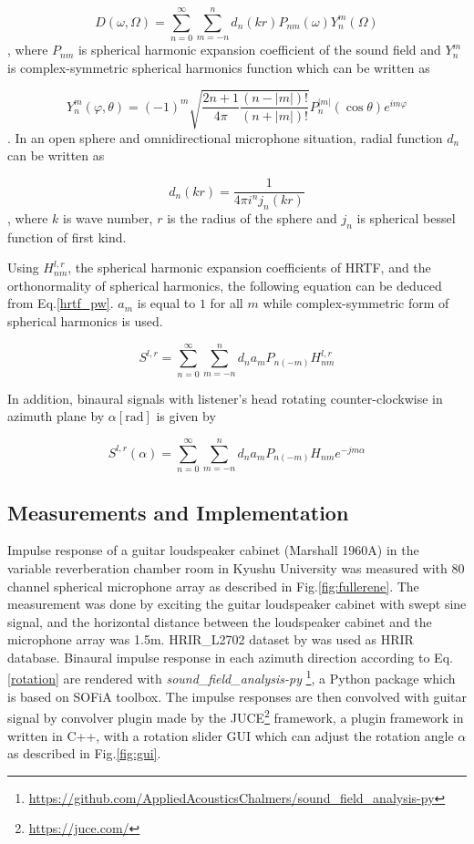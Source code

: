 \documentclass[convention,e-brief]{aesconf-current}
\begin{document}
\begin{equation}
    D\left(\omega, \Omega\right)=\sum_{n=0}^{\infty} \sum_{m=-n}^{n} d_{n}(k r) P_{n m}(\omega) Y_{n}^{m}\left(\Omega\right)
\end{equation}
, where $P_{nm}$ is spherical harmonic expansion coefficient of the sound field and $Y^{m}_n$ is complex-symmetric spherical harmonics function which can be written as

$$
    Y_{n}^{m}(\varphi, \theta) =(-1)^{m} \sqrt{\frac{2 n+1}{4 \pi} \frac{(n-|m|) !}{(n+|m|) !}} P_{n}^{|m|}(\cos \theta) e^{i m \varphi}
$$
.
In an open sphere and omnidirectional microphone situation, radial function $d_n$ can be written as

$$
    d_{n}(kr)=\frac{1}{4 \pi i^{n} j_{n}\left(k r\right)}
$$
, where $k$ is wave number, $r$ is the radius of the sphere and $j_n$ is spherical bessel function of first kind.

Using $H_{nm}^{l,r}$, the spherical harmonic expansion coefficients of HRTF, and the orthonormality of spherical harmonics, the following equation can be deduced from Eq.\ref{hrtf_pw}. $a_{m}$ is equal to $1$ for all $m$ while complex-symmetric form of spherical harmonics is used.

\begin{equation}
    \label{binaural_signal}
    S^{l, r} =\sum_{n=0}^{\infty} \sum_{m=-n}^{n} d_{n} a_{m} P_{n(-m)} H_{n m}^{l,r}
\end{equation}

In addition, binaural signals with listener's head rotating counter-clockwise in azimuth plane by $\alpha[\mathrm{rad}]$ is given by

\begin{equation}
    \label{rotation}
    S^{l, r}(\alpha)=\sum_{n=0}^{\infty} \sum_{m=-n}^{n} d_{n} a_{m} P_{n(-m)} H_{n m} e^{-j m \alpha}
\end{equation}

\subsection{Measurements and Implementation}

Impulse response of a guitar loudspeaker cabinet (Marshall 1960A) in the variable reverberation chamber  room in Kyushu University was measured with 80 channel spherical microphone array as described in Fig.\ref{fig:fullerene}.
The measurement was done by exciting the guitar loudspeaker cabinet with swept sine signal, and the horizontal distance between the loudspeaker cabinet and the microphone array was 1.5m.
HRIR\_L2702 dataset by \citet{Bernschutz2013-zy} was used as HRIR database.
Binaural impulse response in each azimuth direction according to Eq.\ref{rotation} are rendered with \emph{sound\_field\_analysis-py} \footnote{\url{https://github.com/AppliedAcousticsChalmers/sound_field_analysis-py}}, a Python package which is based on SOFiA toolbox\cite{Bernschutz2011-rj}.
The impulse responses are then convolved with guitar signal by convolver plugin made by the JUCE\footnote{\url{https://juce.com/}} framework, a plugin framework in written in C++, with a rotation slider GUI which can adjust the rotation angle $\alpha$ as described in Fig.\ref{fig:gui}.
\end{document}

